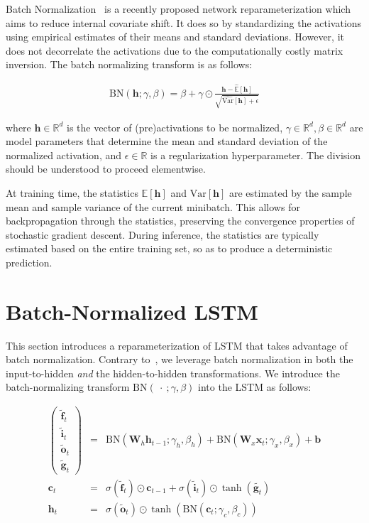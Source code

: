 \documentclass{article} %
\newcommand{\vect}[1]{\mathbf{#1}}
\newcommand{\mat}[1]{\mathbf{#1}}
\newcommand{\ewprod}{\odot}
\newcommand{\reals}{\mathbb{R}}
\begin{document}
Batch Normalization~\citep{batchnorm} is a recently proposed network
reparameterization which aims to reduce internal covariate shift.  It does so by
standardizing the activations using empirical estimates of their means and
standard deviations.  However, it does not decorrelate the activations due to
the computationally costly matrix inversion.  The batch normalizing transform
is as follows:

\begin{align}
\mathrm{BN}(\vect{h}; \gamma, \beta) =
  \beta + \gamma \ewprod
  \frac{\vect{h} -   \widehat{\mathbb{E  }}[\vect{h}]}
       {       \sqrt{\widehat{\mathrm{Var}}[\vect{h}] + \epsilon}}
\end{align}

where $\vect{h} \in \reals^d$ is the vector of (pre)activations to be
normalized, $\gamma \in \reals^d, \beta \in \reals^d$ are model parameters that
determine the mean and standard deviation of the normalized activation, and
$\epsilon \in \reals$ is a regularization hyperparameter. The division should
be understood to proceed elementwise.

At training time, the statistics $\mathbb{E}[\vect{h}]$ and
$\mathrm{Var}[\vect{h}]$ are estimated by the sample mean and sample variance
of the current minibatch.  This allows for backpropagation through the
statistics, preserving the convergence properties of stochastic gradient
descent.  During inference, the statistics are typically estimated based on the
entire training set, so as to produce a deterministic prediction.

\section{Batch-Normalized LSTM}
\label{sec:recurrent-batch-normalization}

This section introduces a reparameterization of LSTM that takes advantage of
batch normalization. Contrary to~\citet{cesar, baidu}, we leverage batch
normalization in both the input-to-hidden \emph{and} the hidden-to-hidden
transformations.  We introduce the batch-normalizing transform $\mathrm{BN}(\
\cdot\ ; \gamma, \beta)$ into the LSTM as follows:

\begin{eqnarray}
\left(\begin{array}{ccc}
\tilde{\vect{f}}_t \\
\tilde{\vect{i}}_t \\
\tilde{\vect{o}}_t \\
\tilde{\vect{g}}_t
\end{array}\right)
 &=&
 \mathrm{BN} (\mat{W}_h \vect{h}_{t-1}; \gamma_h, \beta_h) +
 \mathrm{BN} (\mat{W}_x \vect{x}_t   ; \gamma_x, \beta_x) +
 \vect{b}
\\
\vect{c}_t &=& \sigma(\tilde{\vect{f}}_t) \ewprod \vect{c}_{t-1} +
               \sigma(\tilde{\vect{i}}_t) \ewprod \tanh(\tilde{\vect{g}_t}) \\
\vect{h}_t &=& \sigma(\tilde{\vect{o}}_t) \ewprod \tanh(
 \mathrm{BN} (\vect{c}_t; \gamma_c, \beta_c)
)
\end{eqnarray}
\end{document}

